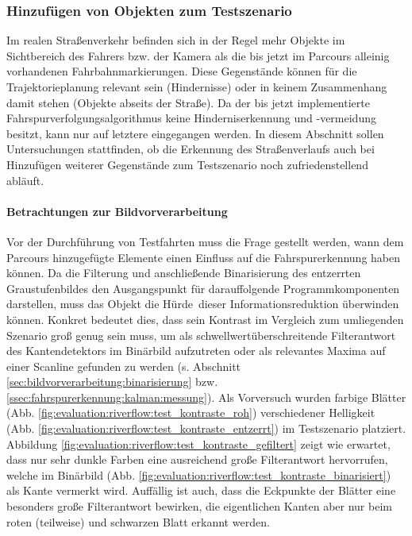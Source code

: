 \subsubsection{Hinzufügen von Objekten zum Testszenario \dcsecondauthorshort}
Im realen Straßenverkehr befinden sich in der Regel mehr Objekte im Sichtbereich des Fahrers bzw. der Kamera als die bis jetzt im Parcours alleinig vorhandenen Fahrbahnmarkierungen. Diese Gegenstände können für die Trajektorieplanung relevant sein (Hindernisse) oder in keinem Zusammenhang damit stehen (Objekte abseits der Straße). Da der bis jetzt implementierte Fahrspurverfolgungsalgorithmus keine Hinderniserkennung und -vermeidung besitzt, kann nur auf letztere eingegangen werden. In diesem Abschnitt sollen Untersuchungen stattfinden, ob die Erkennung des Straßenverlaufs auch bei Hinzufügen weiterer Gegenstände zum Testszenario noch zufriedenstellend abläuft.

\paragraph{Betrachtungen zur Bildvorverarbeitung}
\label{par:evaluation:riverflow:messungen:objekte_hinzufuegen}
Vor der Durchführung von Testfahrten muss die Frage gestellt werden, wann dem Parcours hinzugefügte Elemente einen Einfluss auf die Fahrspurerkennung haben können. Da die Filterung und anschließende Binarisierung des entzerrten Graustufenbildes den Ausgangspunkt für darauffolgende Programmkomponenten darstellen, muss das Objekt die \glqq Hürde\grqq\ dieser Informationsreduktion überwinden können. Konkret bedeutet dies, dass sein Kontrast im Vergleich zum umliegenden Szenario groß genug sein muss, um als schwellwertüberschreitende Filterantwort des Kantendetektors im Binärbild aufzutreten oder als relevantes Maxima auf einer Scanline gefunden zu werden (s. Abschnitt \ref{sec:bildvorverarbeitung:binarisierung} bzw. \ref{ssec:fahrspurerkennung:kalman:messung}).
Als Vorversuch wurden farbige Blätter (Abb. \ref{fig:evaluation:riverflow:test_kontraste_roh}) verschiedener Helligkeit (Abb. \ref{fig:evaluation:riverflow:test_kontraste_entzerrt}) im Testszenario platziert. Abbildung \ref{fig:evaluation:riverflow:test_kontraste_gefiltert} zeigt wie erwartet, dass nur sehr dunkle Farben eine ausreichend große Filterantwort hervorrufen, welche im Binärbild (Abb. \ref{fig:evaluation:riverflow:test_kontraste_binarisiert}) als Kante vermerkt wird. Auffällig ist auch, dass die Eckpunkte der Blätter eine besonders große Filterantwort bewirken, die eigentlichen Kanten aber nur beim roten (teilweise) und schwarzen Blatt erkannt werden.

